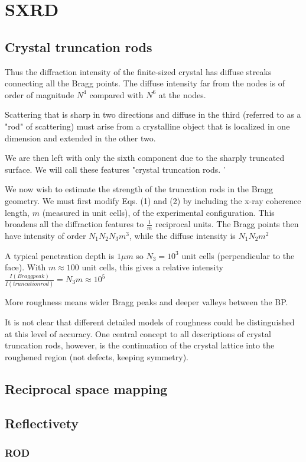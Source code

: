 \section{SXRD}

\subsection{Crystal truncation rods}

Thus the diffraction intensity of the finite-sized crystal has diffuse streaks connecting all the Bragg points. The diffuse intensity far from the nodes is of order of magnitude $N^4$ compared with $N^6$ at the nodes.

Scattering that is sharp in two directions and diffuse in the third (referred to as a "rod" of scattering) must arise from a crystalline object that is localized in one dimension and extended in the other two.

We are then left with only the sixth component due to the sharply truncated surface. We will call these features "crystal truncation rods. '

We now wish to estimate the strength of the truncation rods in the Bragg geometry. We must first modify Eqs. (1) and (2) by including the x-ray coherence length, $m$ (measured in unit cells), of the experimental configuration. This broadens all the diffraction features to $\frac{1}{m}$ reciprocal units. The Bragg points then have intensity of order $N_1 N_2 N_3 m^3$, while the diffuse intensity is $N_1 N_2 m^2$

A typical penetration depth is $1 \mu m$ so $N_3 =10^3$ unit cells (perpendicular to the face). With $m \approx 100$ unit cells, this gives a relative intensity
$\frac{I(Bragg peak)}{I(truncation rod)} = N_3 m \approx 10^5$

More roughness means wider Bragg peaks and deeper valleys between the BP.

It is not clear that different detailed models of roughness could be distinguished at this level of accuracy. One central concept to all descriptions of crystal truncation rods, however, is the continuation of the crystal lattice into the roughened region (not defects, keeping symmetry).

\subsection{Reciprocal space mapping}


\subsection{Reflectivety}


\subsubsection{ROD}
